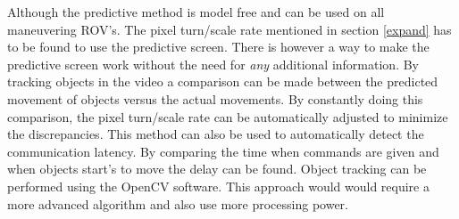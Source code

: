 Although the predictive method is model free and can be used on all maneuvering ROV's. The pixel turn/scale rate mentioned in section \ref{expand} has to be found to use the predictive screen. There is however a way to make the predictive screen work without the need for \textit{any} additional information. By tracking objects in the video a comparison can be made between the predicted movement of objects versus the actual movements. By constantly doing this comparison, the pixel turn/scale rate can be automatically adjusted to minimize the discrepancies. This method can also be used to automatically detect the communication latency. By comparing the time when commands are given and when objects start's to move the delay can be found. Object tracking can be performed using the OpenCV software. This approach would would require a more advanced algorithm and also use more processing power.

